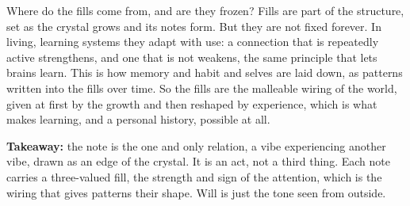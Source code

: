 Where do the fills come from, and are they frozen? Fills are part of the structure, set as the crystal grows and its notes form. But they are not fixed forever. In living, learning systems they adapt with use: a connection that is repeatedly active strengthens, and one that is not weakens, the same principle that lets brains learn. This is how memory and habit and selves are laid down, as patterns written into the fills over time. So the fills are the malleable wiring of the world, given at first by the growth and then reshaped by experience, which is what makes learning, and a personal history, possible at all.

\textbf{Takeaway:} the note is the one and only relation, a vibe experiencing another vibe, drawn as an edge of the crystal. It is an act, not a third thing. Each note carries a three-valued fill, the strength and sign of the attention, which is the wiring that gives patterns their shape. Will is just the tone seen from outside.
